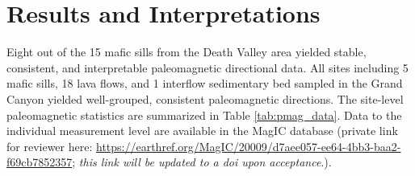 \section*{Results and Interpretations}

Eight out of the 15 mafic sills from the Death Valley area yielded stable, consistent, and interpretable paleomagnetic directional data. All sites including 5 mafic sills, 18 lava flows, and 1 interflow sedimentary bed sampled in the Grand Canyon yielded well-grouped, consistent paleomagnetic directions. The site-level paleomagnetic statistics are summarized in Table \ref{tab:pmag_data}. Data to the individual measurement level are available in the MagIC database (private link for reviewer here: \url{https://earthref.org/MagIC/20009/d7aee057-ee64-4bb3-baa2-f69cb7852357}; \textit{this link will be updated to a doi upon acceptance}.).

